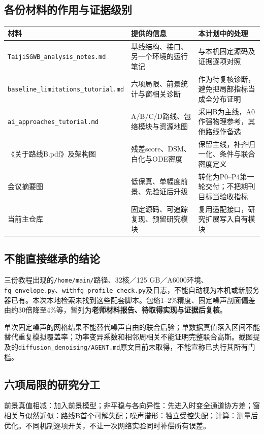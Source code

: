 \documentclass[UTF8,fontset=none,a4paper,11pt]{ctexart}
\newcommand{\code}[1]{\texttt{\nolinkurl{#1}}}
\begin{document}
\subsection{各份材料的作用与证据级别}
\par\noindent\begin{tabularx}{\linewidth}{p{43mm}YY}\toprule
材料 & 提供的信息 & 本计划中的处理\\\midrule
\code{TaijiSGWB_analysis_notes.md} & 基线结构、接口、另一个环境的运行笔记 & 与本机固定源码及证据逐项对照\\
\code{baseline_limitations_tutorial.md} & 六项局限、前景统计与窗相关诊断 & 作为待复核诊断，避免把局部指标当成全分布证明\\
\code{ai_approaches_tutorial.md} & A/B/C/D路线、包络模块与资源地图 & 采用B为主线，A0作强物理参考，其他路线作备选\\
《关于路线B.pdf》及架构图 & 残差score、DSM、白化与ODE密度 & 保留主线，补齐归一化、条件与联合密度定义\\
会议摘要图 & 低保真、单幅度前景、先验证后升级 & 转化为P0--P4第一轮交付；不把期刊目标当验收指标\\
当前主仓库 & 固定源码、可追踪复现、预留研究模块 & 复用适配接口，研究扩展写入自有模块\\\bottomrule
\end{tabularx}\par
\subsection{不能直接继承的结论}
三份教程出现的\code{/home/main/}路径、32核／125 GB／A6000环境、\code{fg_envelope.py}、\code{withfg_profile_check.py}及日志，不能自动视为本机或新服务器已有。本次本地检索未找到这些配套脚本。包络1--2\%精度、固定噪声剖面偏差由约30倍降至4\%等，暂列为\textbf{老师材料报告、待取得实现与证据后复核}。

单次固定噪声的网格结果不能替代噪声自由的联合后验；单数据真值落入区间不能替代重复模拟覆盖率；功率变异系数和相邻周相关不能证明完整联合高斯。截图提及的\code{diffusion_denoising/AGENT.md}原文目前未取得，不能宣称已执行其所有门槛。
\subsection{六项局限的研究分工}
前景真值相减：加入前景模型；非平稳与各向异性：先进入时变全通道协方差；窗相关与似然近似：路线B首个可解失配；噪声谱形：独立受控失配；计算：测量后优化。不同机制逐项开关，不让一次网络实验同时补偿所有误差。
\clearpage
\end{document}
